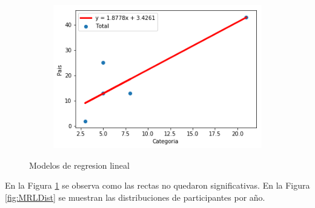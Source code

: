\documentclass[5p,times]{elsarticle}
\begin{document}
\begin{figure}[H]
\begin{subfigure}[b]{0.237\textwidth}
\end{subfigure}
\hfill
\begin{subfigure}[b]{0.237\textwidth}
\includegraphics[width=\textwidth]{04}
\end{subfigure}
\caption{Modelos de regresion lineal}\label{fig:MRL}
\end{figure}


En la Figura \ref{fig:MRL} se observa como las rectas no quedaron significativas. En la Figura \ref{fig:MRLDist} se muestran las distribuciones de participantes por año.
\end{document}
